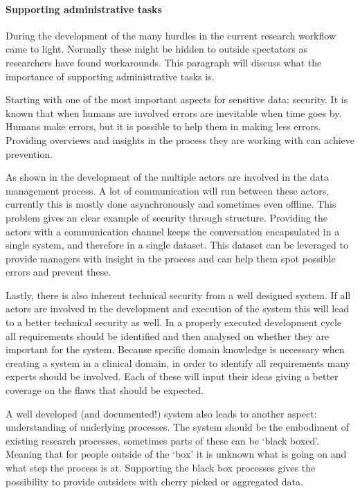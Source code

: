 \paragraph{Supporting administrative tasks}

During the development of the \ivfsystem{} many hurdles in the current research workflow came to light.
Normally these might be hidden to outside spectators as researchers have found workarounds.
This paragraph will discuss what the importance of supporting administrative tasks is.

Starting with one of the most important aspects for sensitive data: security.
It is known that when humans are involved errors are inevitable when time goes by.
Humans make errors, but it is possible to help them in making less errors.
Providing overviews and insights in the process they are working with can achieve prevention.

As shown in the development of the \ivfsystem{} multiple actors are involved in the data management process.
A lot of communication will run between these actors, currently this is mostly done asynchronously and sometimes even offline.
This problem gives an clear example of security through structure.
Providing the actors with a communication channel keeps the conversation encapsulated in a single system, and therefore in a single dataset.
This dataset can be leveraged to provide managers with insight in the process and can help them spot possible errors and prevent these.

Lastly, there is also inherent technical security from a well designed system.
If all actors are involved in the development and execution of the system this will lead to a better technical security as well.
In a properly executed development cycle all requirements should be identified and then analysed on whether they are important for the system.
Because specific domain knowledge is necessary when creating a system in a clinical domain, in order to identify all requirements many experts should be involved.
Each of these will input their ideas giving a better coverage on the flaws that should be expected.

A well developed (and documented!) system also leads to another aspect: understanding of underlying processes.
The system should be the embodiment of existing research processes, sometimes parts of these can be `black boxed'.
Meaning that for people outside of the `box' it is unknown what is going on and what step the process is at.
Supporting the black box processes gives the possibility to provide outsiders with cherry picked or aggregated data.

